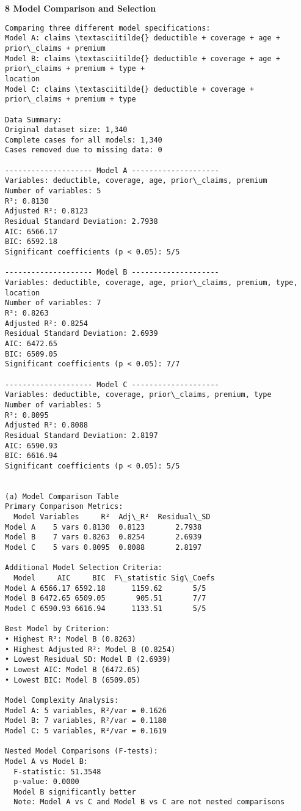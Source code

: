 \documentclass[8pt, twocolumn]{extarticle}
\begin{document}
    \textbf{8 Model Comparison and Selection}
    \begin{Verbatim}[commandchars=\\\{\}]
Comparing three different model specifications:
Model A: claims \textasciitilde{} deductible + coverage + age + prior\_claims + premium
Model B: claims \textasciitilde{} deductible + coverage + age + prior\_claims + premium + type +
location
Model C: claims \textasciitilde{} deductible + coverage + prior\_claims + premium + type

Data Summary:
Original dataset size: 1,340
Complete cases for all models: 1,340
Cases removed due to missing data: 0

-------------------- Model A --------------------
Variables: deductible, coverage, age, prior\_claims, premium
Number of variables: 5
R²: 0.8130
Adjusted R²: 0.8123
Residual Standard Deviation: 2.7938
AIC: 6566.17
BIC: 6592.18
Significant coefficients (p < 0.05): 5/5

-------------------- Model B --------------------
Variables: deductible, coverage, age, prior\_claims, premium, type, location
Number of variables: 7
R²: 0.8263
Adjusted R²: 0.8254
Residual Standard Deviation: 2.6939
AIC: 6472.65
BIC: 6509.05
Significant coefficients (p < 0.05): 7/7

-------------------- Model C --------------------
Variables: deductible, coverage, prior\_claims, premium, type
Number of variables: 5
R²: 0.8095
Adjusted R²: 0.8088
Residual Standard Deviation: 2.8197
AIC: 6590.93
BIC: 6616.94
Significant coefficients (p < 0.05): 5/5


(a) Model Comparison Table
Primary Comparison Metrics:
  Model Variables     R²  Adj\_R²  Residual\_SD
Model A    5 vars 0.8130  0.8123       2.7938
Model B    7 vars 0.8263  0.8254       2.6939
Model C    5 vars 0.8095  0.8088       2.8197

Additional Model Selection Criteria:
  Model     AIC     BIC  F\_statistic Sig\_Coefs
Model A 6566.17 6592.18      1159.62       5/5
Model B 6472.65 6509.05       905.51       7/7
Model C 6590.93 6616.94      1133.51       5/5

Best Model by Criterion:
• Highest R²: Model B (0.8263)
• Highest Adjusted R²: Model B (0.8254)
• Lowest Residual SD: Model B (2.6939)
• Lowest AIC: Model B (6472.65)
• Lowest BIC: Model B (6509.05)

Model Complexity Analysis:
Model A: 5 variables, R²/var = 0.1626
Model B: 7 variables, R²/var = 0.1180
Model C: 5 variables, R²/var = 0.1619

Nested Model Comparisons (F-tests):
Model A vs Model B:
  F-statistic: 51.3548
  p-value: 0.0000
  Model B significantly better
  Note: Model A vs C and Model B vs C are not nested comparisons
    \end{Verbatim}
\end{document}
